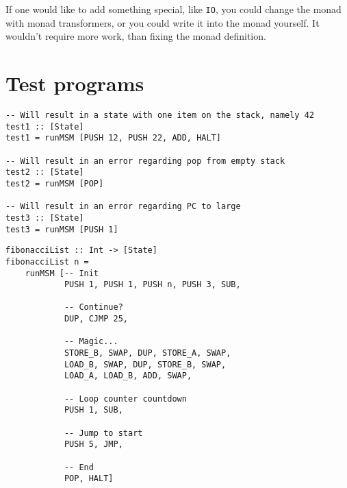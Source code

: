 \documentclass[10pt, a4paper]{article}
\begin{document}
If one would like to add something special, like \texttt{IO}, you could change the monad with monad transformers, or you could write it into the monad yourself.
It wouldn't require more work, than fixing the monad definition.

\section{Test programs}

\begin{lstlisting}
-- Will result in a state with one item on the stack, namely 42
test1 :: [State]
test1 = runMSM [PUSH 12, PUSH 22, ADD, HALT]

-- Will result in an error regarding pop from empty stack
test2 :: [State]
test2 = runMSM [POP]

-- Will result in an error regarding PC to large
test3 :: [State]
test3 = runMSM [PUSH 1]
\end{lstlisting}

\begin{lstlisting}
fibonacciList :: Int -> [State]
fibonacciList n = 
    runMSM [-- Init
            PUSH 1, PUSH 1, PUSH n, PUSH 3, SUB,
            
            -- Continue?
            DUP, CJMP 25,
            
            -- Magic...
            STORE_B, SWAP, DUP, STORE_A, SWAP,
            LOAD_B, SWAP, DUP, STORE_B, SWAP,
            LOAD_A, LOAD_B, ADD, SWAP,
            
            -- Loop counter countdown
            PUSH 1, SUB,
            
            -- Jump to start
            PUSH 5, JMP,
            
            -- End
            POP, HALT]
\end{lstlisting}
\end{document}
